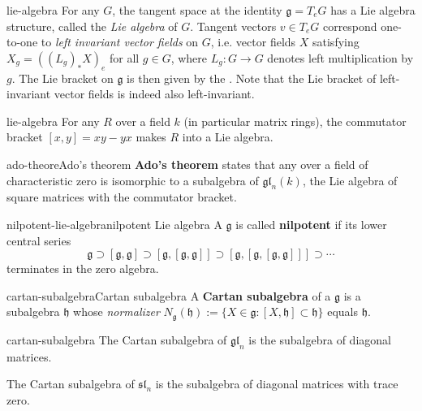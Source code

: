 \begin{example}{lie-algebra}
    For any  $G$, the tangent space at the identity $\mathfrak{g} = T_e G$ has a Lie algebra structure, called the \textit{Lie algebra} of $G$. Tangent vectors $v \in T_e G$ correspond one-to-one to \textit{left invariant vector fields} on $G$, i.e. vector fields $X$ satisfying $X_g = ((L_g)_* X)_e$ for all $g \in G$, where $L_g : G \to G$ denotes left multiplication by $g$. The Lie bracket on $\mathfrak{g}$ is then given by the . Note that the Lie bracket of left-invariant vector fields is indeed also left-invariant.
\end{example}

\begin{example}{lie-algebra}
    For any  $R$ over a field $k$ (in particular matrix rings), the commutator bracket $[x, y] = xy - yx$ makes $R$ into a Lie algebra.
\end{example}

\begin{topic}{ado-theore}{Ado's theorem}
    \textbf{Ado's theorem} states that any  over a field of characteristic zero is isomorphic to a subalgebra of $\mathfrak{gl}_n(k)$, the Lie algebra of square matrices with the commutator bracket.
\end{topic}

\begin{topic}{nilpotent-lie-algebra}{nilpotent Lie algebra}
    A  $\mathfrak{g}$ is called \textbf{nilpotent} if its lower central series
    \[ \mathfrak{g} \supset [\mathfrak{g}, \mathfrak{g}] \supset [\mathfrak{g}, [\mathfrak{g}, \mathfrak{g}]] \supset [\mathfrak{g}, [\mathfrak{g}, [\mathfrak{g}, \mathfrak{g}]]] \supset \cdots \]
    terminates in the zero algebra.
\end{topic}

\begin{topic}{cartan-subalgebra}{Cartan subalgebra}
    A \textbf{Cartan subalgebra} of a  $\mathfrak{g}$ is a  subalgebra $\mathfrak{h}$ whose \textit{normalizer} $N_\mathfrak{g}(\mathfrak{h}) := \{ X \in \mathfrak{g} : [X, \mathfrak{h}] \subset \mathfrak{h} \}$ equals $\mathfrak{h}$.
\end{topic}

\begin{example}{cartan-subalgebra}
    The Cartan subalgebra of $\mathfrak{gl}_n$ is the subalgebra of diagonal matrices.
    
    The Cartan subalgebra of $\mathfrak{sl}_n$ is the subalgebra of diagonal matrices with trace zero.
\end{example}

